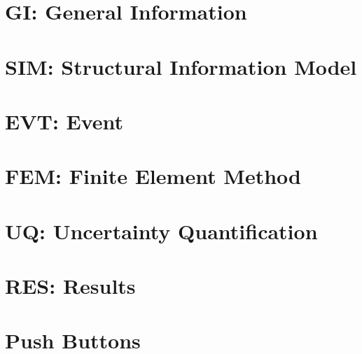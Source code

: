 

\section{GI: General Information}
\label{sec:generalInfo}


\section{SIM: Structural Information Model}
\label{sec:structuralInfo}


\section{EVT: Event}


\section{FEM: Finite Element Method}
\label{sec:fem}


\section{UQ: Uncertainty Quantification}
\label{sec:uq}



\section{RES: Results}
\label{sec:results}



\section{Push Buttons}
\label{sec:push_buttons}

